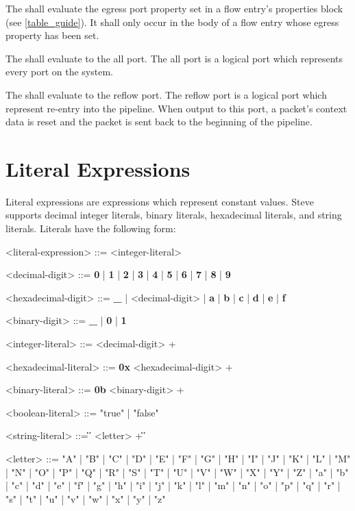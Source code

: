 The  shall evaluate the egress port property set in a flow entry's properties block (see \ref{table_guide}). It shall only occur in the body of a flow entry whose egress property has been set.

The  shall evaluate to the all port. The all port is a logical port which represents every port on the system.

The  shall evaluate to the reflow port. The reflow port is a logical port which represent re-entry into the pipeline. When output to this port, a packet's context data is reset and the packet is sent back to the beginning of the pipeline.

\section{Literal Expressions} \label{literal_expr_guide}

Literal expressions are expressions which represent constant values. Steve supports decimal integer literals, binary literals, hexadecimal literals, and string literals. Literals have the following form:

\begin{minip}
\begin{grammar}
<literal-expression> ::=
<integer-literal>

<decimal-digit> ::= \textbf{0} | \textbf{1} | \textbf{2} | \textbf{3} | \textbf{4} | \textbf{5} | \textbf{6} | \textbf{7} | \textbf{8} | \textbf{9}

<hexadecimal-digit> ::= \textbf{\_} | <decimal-digit> | \textbf{a} | \textbf{b} | \textbf{c} | \textbf{d} | \textbf{e} | \textbf{f}             

<binary-digit> ::= \textbf{\_} | \textbf{0} | \textbf{1}

<integer-literal> ::=
<decimal-digit> +

<hexadecimal-literal> ::=
\textbf{0x} <hexadecimal-digit> +

<binary-literal> ::=
\textbf{0b} <binary-digit> +

<boolean-literal> ::= "true" | "false"

<string-literal> ::=
\textbf{\"} <letter> + \textbf{\"}

<letter> ::= "A" | "B" | "C" | "D" | "E" | "F" | "G"
       | "H" | "I" | "J" | "K" | "L" | "M" | "N"
       | "O" | "P" | "Q" | "R" | "S" | "T" | "U"
       | "V" | "W" | "X" | "Y" | "Z" | "a" | "b"
       | "c" | "d" | "e" | "f" | "g" | "h" | "i"
       | "j" | "k" | "l" | "m" | "n" | "o" | "p"
       | "q" | "r" | "s" | "t" | "u" | "v" | "w"
       | "x" | "y" | "z"

\end{grammar}
\end{minip}

